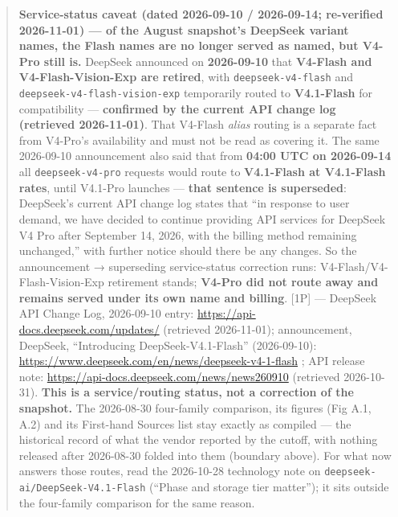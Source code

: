 \begin{quote}
\textbf{Service-status caveat (dated 2026-09-10 / 2026-09-14;
re-verified 2026-11-01) --- of the August snapshot's DeepSeek variant
names, the Flash names are no longer served as named, but V4-Pro still
is.} DeepSeek announced on \textbf{2026-09-10} that \textbf{V4-Flash and
V4-Flash-Vision-Exp are retired}, with \texttt{deepseek-v4-flash} and
\texttt{deepseek-v4-flash-vision-exp} temporarily routed to
\textbf{V4.1-Flash} for compatibility --- \textbf{confirmed by the
current API change log (retrieved 2026-11-01)}. That V4-Flash
\emph{alias} routing is a separate fact from V4-Pro's availability and
must not be read as covering it. The same 2026-09-10 announcement also
said that from \textbf{04:00 UTC on 2026-09-14} all
\texttt{deepseek-v4-pro} requests would route to \textbf{V4.1-Flash at
V4.1-Flash rates}, until V4.1-Pro launches --- \textbf{that sentence is
superseded}: DeepSeek's current API change log states that ``in response
to user demand, we have decided to continue providing API services for
DeepSeek V4 Pro after September 14, 2026, with the billing method
remaining unchanged,'' with further notice should there be any changes.
So the announcement → superseding service-status correction runs:
V4-Flash/V4-Flash-Vision-Exp retirement stands; \textbf{V4-Pro did not
route away and remains served under its own name and billing}. \mbox{{[}1P{]}}
--- DeepSeek API Change Log, 2026-09-10 entry:
\url{https://api-docs.deepseek.com/updates/} (retrieved 2026-11-01);
announcement, DeepSeek, ``Introducing DeepSeek-V4.1-Flash''
(2026-09-10): \url{https://www.deepseek.com/en/news/deepseek-v4-1-flash} ; API
release note: \url{https://api-docs.deepseek.com/news/news260910} (retrieved
2026-10-31). \textbf{This is a service/routing status, not a correction
of the snapshot.} The 2026-08-30 four-family comparison, its figures
(Fig A.1, A.2) and its First-hand Sources list stay exactly as compiled
--- the historical record of what the vendor reported by the cutoff,
with nothing released after 2026-08-30 folded into them (boundary
above). For what now answers those routes, read the 2026-10-28
technology note on \texttt{deepseek-ai/DeepSeek-V4.1-Flash} (``Phase and
storage tier matter''); it sits outside the four-family comparison for
the same reason.
\end{quote}

